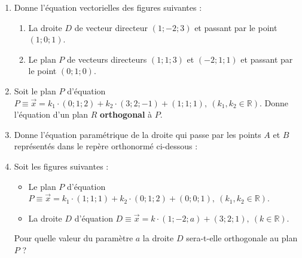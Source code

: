 \begin{enumerate}
\begin{center}
			\end{center}
			
		\item Donne l'équation vectorielles des figures suivantes :
			\begin{enumerate}
				\item La droite $D$ de vecteur directeur $\left(1; -2; 3 \right)$ et passant par le point $\left(1; 0; 1\right)$.
				\item Le plan $P$ de vecteurs directeurs $\left(1; 1; 3\right)$ et $\left(-2; 1; 1\right)$ et passant par le point $\left(0; 1; 0\right)$.
			\end{enumerate}
		
		\item Soit le plan $P$ d'équation $P \equiv \vec{x} = k_1 \cdot \left(0; 1; 2\right) + k_2 \cdot\left(3; 2; -1\right) + \left(1; 1; 1\right), ~(k_1, k_2 \in \mathbb{R})$. Donne l'équation d'un plan $R$ \textbf{orthogonal} à $P$.
		
		\item Donne l'équation paramétrique de la droite qui passe par les points $A$ et $B$ représentés dans le repère orthonormé ci-dessous :
			\begin{center}
			\end{center}
		
		\vspace{3em}
		
		\item Soit les figures suivantes :
			\begin{itemize}
				\item Le plan $P$ d'équation $P \equiv \vec{x} = k_1 \cdot \left(1; 1; 1\right) + k_2 \cdot\left(0; 1; 2\right) + \left(0; 0; 1\right), ~(k_1, k_2 \in \mathbb{R})$.
				\item La droite $D$ d'équation $D \equiv \vec{x} = k \cdot \left(1; -2; a\right) + \left(3; 2; 1\right), ~(k \in \mathbb{R})$.
			\end{itemize}
			Pour quelle valeur du paramètre $a$ la droite $D$ sera-t-elle orthogonale au plan $P$ ?
			

\end{enumerate}
